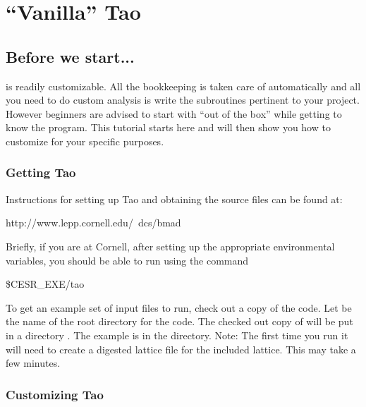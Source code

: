 

\chapter{``Vanilla'' Tao}
\label{c:vanilla_tao}

\section{Before we start...}
\label{s:before_beginning}

\tao is readily customizable. All the bookkeeping is taken care of
automatically and all you need to do custom analysis is write the
subroutines pertinent to your project. However beginners are advised
to start with ``out of the box'' \tao while getting to know the
program. This tutorial starts here and will then show you how to
customize \tao for your specific purposes.

\subsection{Getting Tao}
\label{s:get_and_compile}

Instructions for setting up Tao and obtaining the source files can be
found at:
\begin{example}
  http://www.lepp.cornell.edu/~dcs/bmad
\end{example}

Briefly, if you are at Cornell, after setting up the appropriate environmental 
variables, you should be able to run \tao using the command
\begin{example}
  \$CESR_EXE/tao
\end{example}

To get an example set of input files to run, check out a copy of the \tao code.
Let  be the name of the root directory for the code.
The checked out copy of \tao will be put in a directory
. The example is in the  directory.
Note: The
first time you run \tao it will need to create a digested \bmad
lattice file for the included lattice. This may take a few minutes.

\subsection{Customizing Tao}

